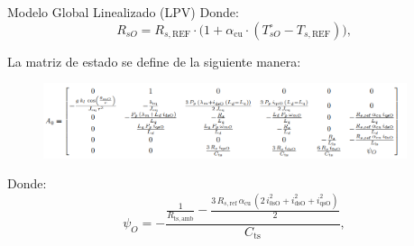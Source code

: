 \documentclass[12pt]{beamer}
\begin{document}
\begin{frame}{Modelo Global Linealizado (LPV)}\footnotesize
Donde:
\[
R_{sO} = R_{s, \text{REF}} \cdot \Big( 1 + \alpha_\text{cu} \cdot (T_{sO}^\circ - T_{s, \text{REF}}) \Big),
\]

La matriz de estado se define de la siguiente manera:

\begin{figure}[h]
\centering
\includegraphics[width=0.95\textwidth]{Imagenes/MatrizAo.png}
\end{figure}

 Donde: 
\[
\psi_O = -\frac{\frac{1}{R_{\mathrm{ts},\mathrm{amb}}} - \frac{3\,R_{s,\mathrm{ref}}\,\alpha_{\mathrm{cu}}\,\left(2\,i_{\mathrm{0sO}}^2 + i_{\mathrm{dsO}}^2 + i_{\mathrm{qsO}}^2\right)}{2}}{C_{\mathrm{ts}}},
\]
\end{frame}
\end{document}
